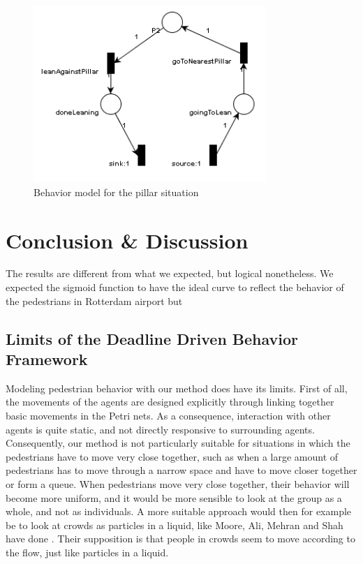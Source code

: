 \documentclass[11pt]{article}
\begin{document}
\begin{figure}
\centering
\includegraphics[width=250pt]{pillarSituation}
\caption{Behavior model for the pillar situation}
\label{toiletsituation}
\end{figure}



\section{Conclusion \& Discussion}
The results are different from what we expected, but logical nonetheless. We expected the sigmoid function to have the ideal curve to reflect the behavior of the pedestrians in Rotterdam airport but


\subsection{Limits of the Deadline Driven Behavior Framework}
Modeling pedestrian behavior with our method does have its limits. First of all, the movements of the agents are designed explicitly through linking together basic movements in the Petri nets. As a consequence, interaction with other agents is quite static, and not directly responsive to surrounding agents. Consequently, our method is not particularly suitable for situations in which the pedestrians have to move very close together, such as when a large amount of pedestrians has to move through a narrow space and have to move closer together or form a queue. When pedestrians move very close together, their behavior will become more uniform, and it would be more sensible to look at the group as a whole, and not as individuals. A more suitable approach would then for example be to look at crowds as particles in a liquid, like Moore, Ali, Mehran and Shah have done \cite{Moore:2011:VCS:2043174.2043192}. Their supposition is that people in crowds seem to move according to the flow, just like particles in a liquid.
\end{document}
